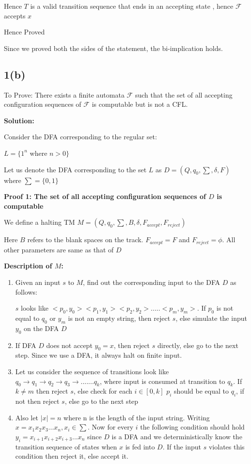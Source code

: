 \documentclass[12pt,a4paper]{article}
\begin{document}
Hence $T$ is a valid transition sequence that ends in an accepting state , hence $\mathcal{F}$ accepts $x$

Hence Proved

Since we proved both the sides of the statement, the bi-implication holds.

\subsection{1(b)}
To Prove: There exists a finite automata $\mathcal{F}$ such that the set of all accepting configuration sequences of $\mathcal{F}$ is computable but is not a CFL.

\textbf{Solution:}

Consider the DFA corresponding to the regular set:

\begin{center}
    $L=\{{1^n}$ where $n>0 \}$
\end{center}

Let us denote the DFA corresponding to the set $L$ as $D=(Q,q_0,\sum,\delta,F)$ where $\sum =\{0,1\}$

\textbf{Proof 1: The set of all accepting configuration sequences of $D$ is computable}

We define a halting TM $M=(Q,q_0,\sum,B,\delta,F_{accept},F_{reject})$


Here $B$ refers to the blank spaces on the track.
$F_{accept}=F$ and $F_{reject}=\phi$. All other parameters are same as that of $D$

\textbf{Description of $M$:}
\begin{enumerate}
\item Given an input $s$ to $M$, find out the corresponding input to the DFA $D$ as follows:

$s$ looks like $<p_0,y_0><p_1,y_1><p_2,y_2>.....<p_m,y_m>$. If $p_0$ is not equal to $q_0$ or $y_m$ is not an empty string, then reject $s$, else simulate the input $y_0$ on the DFA $D$
\item If DFA $D$ does not accept $y_0 = x$, then reject $s$ directly, else go to the next step. Since we use a DFA, it always halt on finite input.
\item Let us consider the sequence of transitions look like $q_0 \rightarrow q_1 \rightarrow q_2 \rightarrow q_3 \rightarrow .......q_k$, where input is consumed at transition to $q_k$. 
If $k \neq m$ then reject $s$, else check for each $i \in [0,k]$ $p_i$ should be equal to $q_i$, if not then reject $s$, else go to the next step
\item Also let $|x|=n$ where n is the length of the input string. Writing $x=x_1x_2x_3...x_n , x_i \in \sum$. Now for every $i$ the following condition should hold $y_i=x_{i+1}x_{i+2}x_{i+3}...x_{n}$ since $D$ is a DFA and we deterministically know the transition sequence of states when $x$ is fed into $D$.
If the input $s$ violates this condition then reject it, else accept it.

\end{enumerate}
\end{document}
